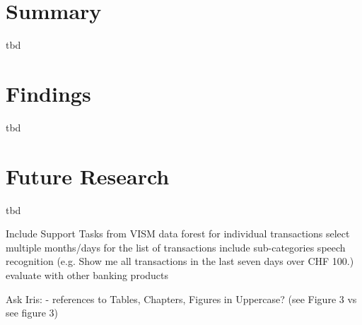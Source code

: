 \section{Summary}

tbd




\section{Findings}

tbd




\section{Future Research}

tbd


Include Support Tasks from VISM \newline
data forest for individual transactions \newline
select multiple months/days for the list of transactions \newline
include sub-categories \newline
speech recognition (e.g. Show me all transactions in the last seven days over CHF 100.) \newline
evaluate with other banking products  \newline


Ask Iris:  \newline
- references to Tables, Chapters, Figures in Uppercase? (see Figure 3 vs see figure 3)